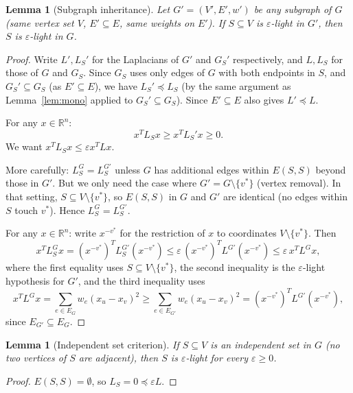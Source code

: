 \documentclass[12pt]{article}
\newtheorem{lemma}[theorem]{Lemma}
\theoremstyle{definition}
\begin{document}
\begin{lemma}[Subgraph inheritance]\label{lem:inherit}
Let $G' = (V', E', w')$ be any subgraph of $G$ (same vertex set $V$, $E' \subseteq E$, same weights on $E'$). If $S \subseteq V$ is $\varepsilon$-light in $G'$, then $S$ is $\varepsilon$-light in $G$.
\end{lemma}

\begin{proof}
Write $L', L_S'$ for the Laplacians of $G'$ and $G_{S}'$ respectively, and $L, L_S$ for those of $G$ and $G_S$. Since $G_S$ uses only edges of $G$ with both endpoints in $S$, and $G_S' \subseteq G_S$ (as $E' \subseteq E$), we have $L_S' \preceq L_S$ (by the same argument as Lemma~\ref{lem:mono} applied to $G_S' \subseteq G_S$). Since $E' \subseteq E$ also gives $L' \preceq L$.

For any $x \in \mathbb{R}^n$:
\[
x^T L_S x \geq x^T L_S' x \geq 0.
\]
We want $x^T L_S x \leq \varepsilon x^T L x$.

More carefully: $L_S^G = L_S^{G'}$ unless $G$ has additional edges within $E(S,S)$ beyond those in $G'$. But we only need the case where $G' = G \setminus \{v^*\}$ (vertex removal). In that setting, $S \subseteq V \setminus \{v^*\}$, so $E(S,S)$ in $G$ and $G'$ are identical (no edges within $S$ touch $v^*$). Hence $L_S^G = L_S^{G'}$.

For any $x \in \mathbb{R}^n$: write $x^{-v^*}$ for the restriction of $x$ to coordinates $V \setminus \{v^*\}$. Then
\[
x^T L_S^G x = (x^{-v^*})^T L_S^{G'} (x^{-v^*})
\leq \varepsilon \,(x^{-v^*})^T L^{G'} (x^{-v^*})
\leq \varepsilon \, x^T L^G x,
\]
where the first equality uses $S \subseteq V \setminus \{v^*\}$, the second inequality is the $\varepsilon$-light hypothesis for $G'$, and the third inequality uses
\[
x^T L^G x = \sum_{e \in E_G} w_e(x_u - x_v)^2 \geq \sum_{e \in E_{G'}} w_e(x_u - x_v)^2 = (x^{-v^*})^T L^{G'} (x^{-v^*}),
\]
since $E_{G'} \subseteq E_G$.
\end{proof}

\begin{lemma}[Independent set criterion]\label{lem:indset}
If $S \subseteq V$ is an independent set in $G$ (no two vertices of $S$ are adjacent), then $S$ is $\varepsilon$-light for every $\varepsilon \geq 0$.
\end{lemma}

\begin{proof}
$E(S,S) = \emptyset$, so $L_S = 0 \preceq \varepsilon L$.
\end{proof}
\end{document}
